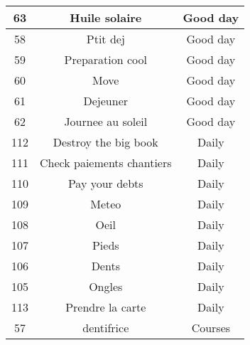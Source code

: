 \begin{longtable}{|c|c|c|}
\hline
63 & Huile solaire & Good day\\
\hline
58 & Ptit dej & Good day\\
\hline
59 & Preparation cool & Good day\\
\hline
60 & Move & Good day\\
\hline
61 & Dejeuner & Good day\\
\hline
62 & Journee au soleil & Good day\\
\hline
112 & Destroy the big book & Daily\\
\hline
111 & Check paiements chantiers & Daily\\
\hline
110 & Pay your debts & Daily\\
\hline
109 & Meteo & Daily\\
\hline
108 & Oeil & Daily\\
\hline
107 & Pieds & Daily\\
\hline
106 & Dents & Daily\\
\hline
105 & Ongles & Daily\\
\hline
113 & Prendre la carte & Daily\\
\hline
57 & dentifrice & Courses\\
\hline
\end{longtable}
